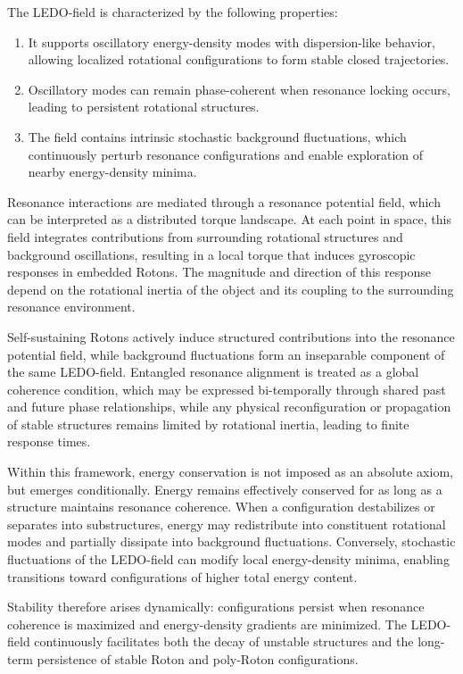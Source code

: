 \documentclass[11pt,a4paper]{article}
\begin{document}
The LEDO-field is characterized by the following properties:
\begin{enumerate}
  \item It supports oscillatory energy-density modes with dispersion-like behavior, allowing localized rotational configurations to form stable closed trajectories.
  \item Oscillatory modes can remain phase-coherent when resonance locking occurs, leading to persistent rotational structures.
  \item The field contains intrinsic stochastic background fluctuations, which continuously perturb resonance configurations and enable exploration of nearby energy-density minima.
\end{enumerate}

Resonance interactions are mediated through a resonance potential field, which can be interpreted as a distributed torque landscape. At each point in space, this field integrates contributions from surrounding rotational structures and background oscillations, resulting in a local torque that induces gyroscopic responses in embedded Rotons. The magnitude and direction of this response depend on the rotational inertia of the object and its coupling to the surrounding resonance environment.

Self-sustaining Rotons actively induce structured contributions into the resonance potential field, while background fluctuations form an inseparable component of the same LEDO-field. Entangled resonance alignment is treated as a global coherence condition, which may be expressed bi-temporally through shared past and future phase relationships, while any physical reconfiguration or propagation of stable structures remains limited by rotational inertia, leading to finite response times.

Within this framework, energy conservation is not imposed as an absolute axiom, but emerges conditionally. Energy remains effectively conserved for as long as a structure maintains resonance coherence. When a configuration destabilizes or separates into substructures, energy may redistribute into constituent rotational modes and partially dissipate into background fluctuations. Conversely, stochastic fluctuations of the LEDO-field can modify local energy-density minima, enabling transitions toward configurations of higher total energy content.

Stability therefore arises dynamically: configurations persist when resonance coherence is maximized and energy-density gradients are minimized. The LEDO-field continuously facilitates both the decay of unstable structures and the long-term persistence of stable Roton and poly-Roton configurations.
\end{document}
